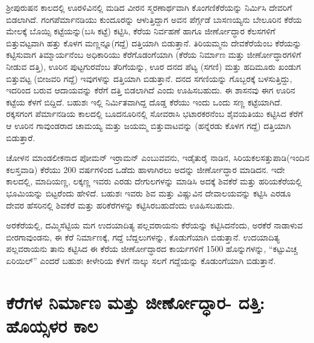 ಶ‍್ರೀಪುರುಷನ ಕಾಲದಲ್ಲಿ ಊರಳಿವಿನಲ್ಲಿ ಮಡಿದ ವೀರನ ಸ್ಮರಣಾರ್ಥವಾಗಿ ಕೊಂಗಣಿಕೆರೆಯನ್ನು ನಿರ್ಮಿಸಿ ದೇವರಿಗೆ ಬಿಡಲಾಗಿದೆ. ಗಂಗಪೆರ್ಮಾನಡಿಯು ಕುಂದೂರನ್ನು ಆಳುತ್ತಿದ್ದಾಗ ಅವನ ಪೆರ್ಗ್ಗಡೆ ಬಾಸಣಯ್ಯನು ಬೇಲೂರಿನ ಕೆರೆಯ ಮೇಲಕ್ಕೆ ಬೊಯ್ಸಿ ಕಟ್ಟೆಯನ್ನು(ಬಸಿ ಕಟ್ಟೆ) ಕಟ್ಟಿಸಿ, ಕೆರೆಯ ನಿರ್ವಹಣೆ ಹಾಗೂ ಜೀರ್ಣೋದ್ಧಾರ ಕೆಲಸಗಳಿಗೆ ಬಿತ್ತುವಟ್ಟವಾಗಿ ಹತ್ತು ಕೊಳಗ ಮಣ್ಣನ್ನೂ(ಗದ್ದೆ) ದತ್ತಿಯಾಗಿ ಬಿಡುತ್ತಾನೆ. ತಿರಿಯಮ್ಮನು ದೇವಕೆರೆಯೆಂಬ ಕೆರೆಯನ್ನು ಕಟ್ಟಿಸುವಾಗ ತಿಮ್ಮಾರ್ಯನೆಂಬ ಅಧಿಕಾರಿಯು ಕೆರೆಗೊಡಂಗೆಯಾಗಿ (ಕೆರೆಯ ನಿರ್ಮಾಣ ಮತ್ತು ಜೀರ್ಣೋದ್ಧಾರಗಳಿಗೆ ನೀಡುವ ದತ್ತಿ), ಊರಿನ ಪುಟ್ಟಗುರವೆಂಬ ತೆರಿಗೆಯನ್ನು, ಊರ ದನದ ಪೆಟ್ಯ (ಸಗಣಿ) ಮತ್ತು ಹದಿಮೂರು ಖಂಡುಗ ಬಿತ್ತುವಟ್ಟ (ಬೀಜವರಿ ಗದ್ದೆ) ಇವುಗಳನ್ನು ದತ್ತಿಯಾಗಿ ಬಿಡುತ್ತಾನೆ. ದನದ ಸಗಣಿಯನ್ನು ಗೊಬ್ಬರಕ್ಕೆ ಬಳಸುತ್ತಿದ್ದು, ಇದರಿಂದ ಬರುವ ಆದಾಯವನ್ನು ಕೆರೆಗೆ ದತ್ತಿ ಬಿಡಲಾಗಿದೆ ಎಂದು ಊಹಿಸಬಹುದು. ಈ ಶಾಸನವು ಈಗ ಊರಿನ ಕಟ್ಟೆಯ ಕೆಳಗೆ ಬಿದ್ದಿದೆ. ಬಹುಶಃ ಇಲ್ಲಿ ನಿರ್ಮಿತವಾಗಿದ್ದ ದೊಡ್ಡ ಕೆರೆಯು ಇಂದು ಒಂದು ಸಣ್ಣ ಕಟ್ಟೆಯಾಗಿದೆ. ರಕ್ಕಸಗಂಗ ಪೆರ್ಮಾನಡಿಯ ಕಾಲದಲ್ಲಿ ಬೂದನೂರಿನಲ್ಲಿ ಸೋವರಾಸಿ ಭಟಾರಕರನೆಂಬ ಶೈವಯತಿಯು ಕಟ್ಟಿಸಿದ ಕೆರೆಗೆ ಆ ಊರಿನ ಗಾವುಂಡರಾದ ಚಾಮಯ್ಯ ಮತ್ತು ಜಯಮ್ಮ ಬಿತ್ತುವಾಟವನ್ನು (ಹನ್ನೆರಡು ಕೊಳಗ ಗದ್ದೆ) ದತ್ತಿಯಾಗಿ ಬಿಡುತ್ತಾರೆ.

ಚೋಳನ ಮಾಂಡಲೀಕನಾದ ಪೋಮನ್​ ಇರ್ರಾಮನ್​ ಎಂಬುವವನು, ಇಡೈತುರೈ ನಾಡಿನ, ಸಿರಿಯಕಲಸತ್ತುಪಾಡಿ(ಇಂದಿನ ಕಲಸ್ತವಾಡಿ) ಕೆರೆಯು 200 ವರ್ಷಗಳಿಂದ ಒಡೆದು ಹಾಳಾಗಿರಲು ಅದನ್ನು ಜೀರ್ಣೋದ್ಧಾರ ಮಾಡಿದನ. ಇದೇ ಕಾಲದಲ್ಲಿ, ಮಾದಿಯಣ್ಣ, ಲಕ್ಕಣ್ಣ ಇವರು ಎರಡು ದೇಗುಲಗಳನ್ನು ಮಾಡಿಸಿ ಅದಕ್ಕೆ ಶಿವಕೆರೆ ಮತ್ತು ಹರಿಯಕೆರೆಯಲ್ಲಿ ಭೂಮಿಯನ್ನು ಬಿಟ್ಟರೆಂದು ಹೇಳಿದೆ. ಬಹುಶಃ ಇವರು ಶಿವ ಮತ್ತು ವಿಷ್ಣುವಿನ ದೇವಾಲಯವನ್ನು ಕಟ್ಟಿಸಿ ಎರಡೂ ದೇವರ ಹೆಸರಿನಲ್ಲಿ ಶಿವಕೆರೆ ಮತ್ತು ಹರಿಕೆರೆಗಳನ್ನು ಕಟ್ಟಿಸಿರಬಹುದೆಂದು ಊಹಿಸಬಹುದು.

ಅರಕೆರೆಯಲ್ಲಿ, ದಮ್ಮಿಸೆಟ್ಟಿಯ ಮಗ ಉದಯಾದಿತ್ಯ ಪಲ್ಲವರಾಯನು ಕೆರೆಯನ್ನು ಕಟ್ಟಿಸಿದನೆಂದು, ಅರಕೆರೆ ನಾಡಾಳುವ ಬೀರಗಾವುಂಡನು, ಈ ಕೆರೆ ನಿರ್ಮಾಣಕ್ಕೆ, ಗದ್ದೆ ಬೆದ್ದಲುಗಳನ್ನು, ಕೊಡುಗೆಯಾಗಿ ಬಿಡುತ್ತಾನೆ. ಉದಯಾದಿತ್ಯ ಪಲ್ಲವರಾಯನು ತಾನು ಕಟ್ಟಿಸಿದ ಈ ಕೆರೆಯ ಜೀರ್ಣೋದ್ಧಾರದ ಕಾರ್ಯಗಳಿಗೆ 1500 ಹೊನ್ನುಗಳನ್ನು, “ಕಟ್ಟುವಿಚ್ಚ ಏರಿಯಿಲ್​” ಎಂದರೆ ಬಹುಶಃ ಕೀಳೇರಿಯ ಕೆಳಗೆ ನಾಲ್ಕು ಸಲಗೆ ಗದ್ದೆಯನ್ನು ಕೊಡುಂಗೆಯಾಗಿ ಬಿಡುತ್ತಾನೆ.


\section{ಕೆರೆಗಳ ನಿರ್ಮಾಣ ಮತ್ತು ಜೀರ್ಣೋದ್ಧಾರ- ದತ್ತಿ: ಹೊಯ್ಸಳರ ಕಾಲ}

